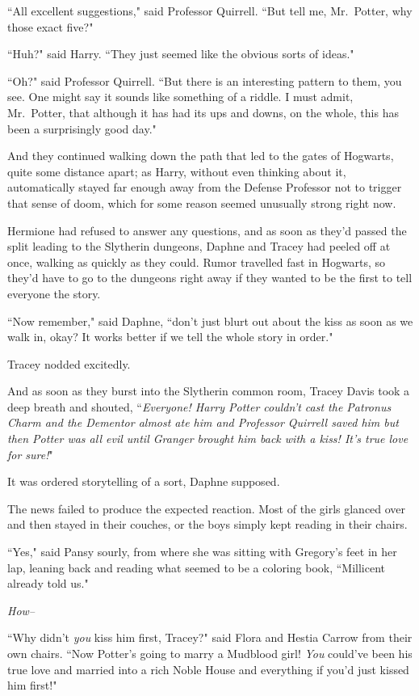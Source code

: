 ``All excellent suggestions," said Professor Quirrell. ``But tell me, Mr.~Potter, why those exact five?"

``Huh?" said Harry. ``They just seemed like the obvious sorts of ideas."

``Oh?" said Professor Quirrell. ``But there is an interesting pattern to them, you see. One might say it sounds like something of a riddle. I must admit, Mr.~Potter, that although it has had its ups and downs, on the whole, this has been a surprisingly good day."

And they continued walking down the path that led to the gates of Hogwarts, quite some distance apart; as Harry, without even thinking about it, automatically stayed far enough away from the Defense Professor not to trigger that sense of doom, which for some reason seemed unusually strong right now.


Hermione had refused to answer any questions, and as soon as they'd passed the split leading to the Slytherin dungeons, Daphne and Tracey had peeled off at once, walking as quickly as they could. Rumor travelled fast in Hogwarts, so they'd have to go to the dungeons right away if they wanted to be the first to tell everyone the story.

``Now remember," said Daphne, ``don't just blurt out about the kiss as soon as we walk in, okay? It works better if we tell the whole story in order."

Tracey nodded excitedly.

And as soon as they burst into the Slytherin common room, Tracey Davis took a deep breath and shouted, ``\emph{Everyone! Harry Potter couldn't cast the Patronus Charm and the Dementor almost ate him and Professor Quirrell saved him but then Potter was all evil until Granger brought him back with a kiss! It's true love for sure!}"

It was ordered storytelling of a sort, Daphne supposed.

The news failed to produce the expected reaction. Most of the girls glanced over and then stayed in their couches, or the boys simply kept reading in their chairs.

``Yes," said Pansy sourly, from where she was sitting with Gregory's feet in her lap, leaning back and reading what seemed to be a coloring book, ``Millicent already told us."

\emph{How\---}

``Why didn't \emph{you} kiss him first, Tracey?" said Flora and Hestia Carrow from their own chairs. ``Now Potter's going to marry a Mudblood girl! \emph{You} could've been his true love and married into a rich Noble House and everything if you'd just kissed him first!"

